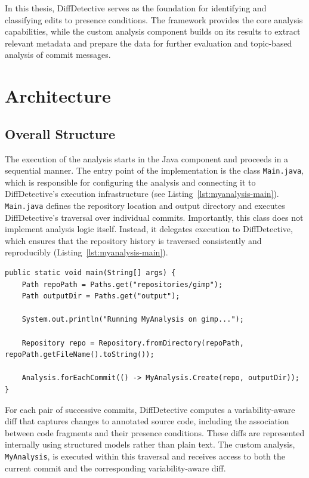 In this thesis, DiffDetective serves as the foundation for identifying and classifying edits to presence conditions. The framework provides the core analysis capabilities, while the custom analysis component builds on its results to extract relevant metadata and prepare the data for further evaluation and topic-based analysis of commit messages.

\section{Architecture}

\subsection{Overall Structure}

The execution of the analysis starts in the Java component and proceeds in a sequential manner. The entry point of the implementation is the class \texttt{Main.java}, which is responsible for configuring the analysis and connecting it to DiffDetective’s execution infrastructure  (see Listing~\ref{lst:myanalysis-main}). \texttt{Main.java} defines the repository location and output directory and executes DiffDetective’s traversal over individual commits. Importantly, this class does not implement analysis logic itself. Instead, it delegates execution to DiffDetective, which ensures that the repository history is traversed consistently and reproducibly (Listing~\ref{lst:myanalysis-main}).
\clearpage

\begin{lstlisting}[style=mypicturestyle, caption={MyAnalysis runner (main method)}, label={lst:myanalysis-main}]
public static void main(String[] args) {
    Path repoPath = Paths.get("repositories/gimp");
    Path outputDir = Paths.get("output");

    System.out.println("Running MyAnalysis on gimp...");

    Repository repo = Repository.fromDirectory(repoPath, repoPath.getFileName().toString());

    Analysis.forEachCommit(() -> MyAnalysis.Create(repo, outputDir));
}
\end{lstlisting}

For each pair of successive commits, DiffDetective computes a variability-aware diff that captures changes to annotated source code, including the association between code fragments and their presence conditions. These diffs are represented internally using structured models rather than plain text. The custom analysis, \texttt{MyAnalysis}, is executed within this traversal and receives access to both the current commit and the corresponding variability-aware diff.

